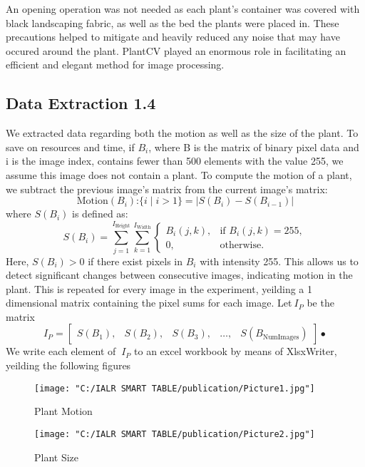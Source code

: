 \documentclass[12pt]{article}
\begin{document}
An opening operation was not needed as each plant's container was covered with black landscaping fabric, as well as the bed the plants were placed in. These precautions helped to mitigate and heavily reduced any noise that may have occured around the plant. PlantCV played an enormous role in facilitating an efficient and elegant method for image processing.

\subsection*{Data Extraction 1.4}
\hspace{1cm} We extracted data regarding both the motion as well as the size of the plant. To save on resources and time, if \( B_{i} \), where B is the matrix of binary pixel data and i is the image index, contains fewer than 500 elements with the value 255, we assume this image does not contain a plant. To compute the motion of a plant, we subtract the previous image's matrix from the current image's matrix:
\begin{equation}
\text{Motion}(B_{i})\text{:}\{i \mid i > 1\} = |S(B_{i}) - S(B_{i-1})|
\end{equation}
where \( S(B_{i}) \) is defined as:
\[
S(B_{i}) = \sum_{j=1}^{I_{\text{Height}}} \sum_{k=1}^{I_{\text{Width}}} 
\begin{cases}
B_{i}(j, k), & \text{if } B_{i}(j, k) = 255, \\
0, & \text{otherwise}.
\end{cases}
\]
Here, \( S(B_{i}) > 0 \) if there exist pixels in \( B_{i} \) with intensity 255. This allows us to detect significant changes between consecutive images, indicating motion in the plant. This is repeated for every image in the experiment, yeilding a 1 dimensional matrix containing the pixel sums for each image. Let\(\ I_{P} \) be the matrix
\begin{equation}
I_{P} = 
\begin{bmatrix}
S(B_{1}),&S(B_{2}),&S(B_{3}),&\dots,&S(B_{\text{NumImages}})
\end{bmatrix}•
\end{equation}
We write each element of \(\ I_{P} \) to an excel workbook by means of XlsxWriter, yeilding the following figures

\begin{figure}[H]
  \centering
  \texttt{[image: "C:/IALR SMART TABLE/publication/Picture1.jpg"]}
  \caption{Plant Motion}
  \label{fig:species_rgb}
\end{figure}
\begin{figure}
  \centering
  \texttt{[image: "C:/IALR SMART TABLE/publication/Picture2.jpg"]}
  \caption{Plant Size}
  \label{fig:species_ycrcb}
\end{figure}
\end{document}
